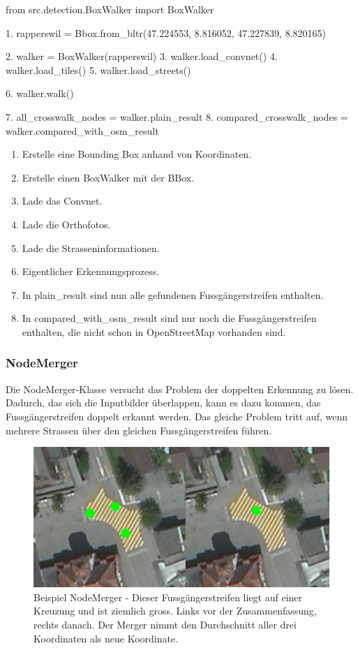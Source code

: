 \begin{python}
	from src.detection.BoxWalker import BoxWalker
	
	1. rapperswil = Bbox.from_bltr(47.224553, 8.816052, 47.227839, 8.820165)
	
	2. walker = BoxWalker(rapperswil)
	3. walker.load_convnet()
	4. walker.load_tiles()
	5. walker.load_streets()
	
	6. walker.walk()
	
	7. all_crosswalk_nodes = walker.plain_result
	8. compared_crosswalk_nodes = walker.compared_with_osm_result
\end{python}
\begin{enumerate}
	\item Erstelle eine Bounding Box anhand von Koordinaten.
	\item Erstelle einen BoxWalker mit der BBox.
	\item Lade das Convnet.
	\item Lade die Orthofotos.
	\item Lade die Strasseninformationen.
	\item Eigentlicher Erkennungsprozess.
	\item In plain\_result sind nun alle gefundenen Fussgängerstreifen enthalten.
	\item In compared\_with\_osm\_result sind nur noch die Fussgängerstreifen enthalten, die nicht schon in OpenStreetMap vorhanden sind.
\end{enumerate}

\subsubsection{NodeMerger}
Die NodeMerger-Klasse versucht das Problem der doppelten Erkennung zu lösen. Dadurch, das sich die Inputbilder überlappen, kann es dazu kommen, das Fussgängerstreifen doppelt erkannt werden. Das gleiche Problem tritt auf, wenn mehrere Strassen über den gleichen Fussgängerstreifen führen.
\\
\begin{figure}[H]
	\centering
	\includegraphics{images/NodeMerger_Beispiel.png}
	\caption[Beispiele NodeMerger]{Beispiel NodeMerger - Dieser Fussgängerstreifen liegt auf einer Kreuzung und ist ziemlich gross. Links vor der Zusammenfassung, rechts danach. Der Merger nimmt den Durchschnitt aller drei Koordinaten als neue Koordinate.}
\end{figure}


